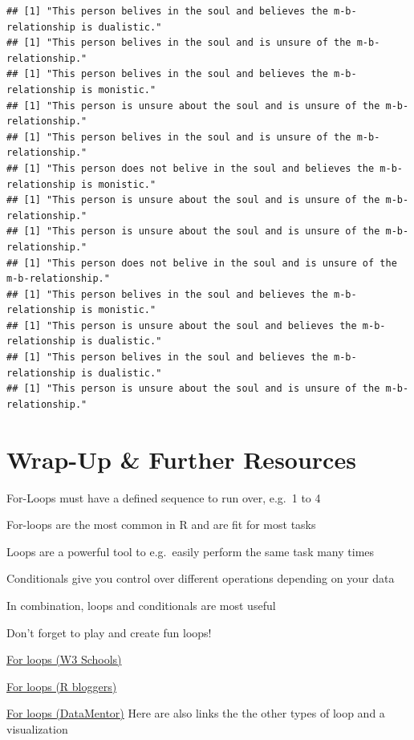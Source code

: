 \documentclass[
]{book}
\begin{document}
\begin{verbatim}
## [1] "This person belives in the soul and believes the m-b-relationship is dualistic."
## [1] "This person belives in the soul and is unsure of the m-b-relationship."
## [1] "This person belives in the soul and believes the m-b-relationship is monistic."
## [1] "This person is unsure about the soul and is unsure of the m-b-relationship."
## [1] "This person belives in the soul and is unsure of the m-b-relationship."
## [1] "This person does not belive in the soul and believes the m-b-relationship is monistic."
## [1] "This person is unsure about the soul and is unsure of the m-b-relationship."
## [1] "This person is unsure about the soul and is unsure of the m-b-relationship."
## [1] "This person does not belive in the soul and is unsure of the m-b-relationship."
## [1] "This person belives in the soul and believes the m-b-relationship is monistic."
## [1] "This person is unsure about the soul and believes the m-b-relationship is dualistic."
## [1] "This person belives in the soul and believes the m-b-relationship is dualistic."
## [1] "This person is unsure about the soul and is unsure of the m-b-relationship."
\end{verbatim}

\section{Wrap-Up \& Further Resources}\label{wrap-up-further-resources-4}

For-Loops must have a defined sequence to run over, e.g.~1 to 4

For-loops are the most common in R and are fit for most tasks

Loops are a powerful tool to e.g.~easily perform the same task many times

Conditionals give you control over different operations depending on your data

In combination, loops and conditionals are most useful

Don't forget to play and create fun loops!

\href{https://www.w3schools.com/r/r_for_loop.asp/}{For loops (W3 Schools)}

\href{https://www.r-bloggers.com/2015/12/how-to-write-the-first-for-loop-in-r/}{For loops (R bloggers)}

\href{https://www.datamentor.io/r-programming/for-loop}{For loops (DataMentor)} Here are also links the the other types of loop and a visualization
\end{document}
